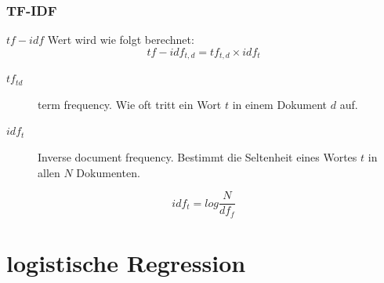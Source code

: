 \documentclass{beamer}
\begin{document}
\begin{frame}
  \frametitle{TF-IDF}
  $tf-idf$ Wert wird wie folgt berechnet:
\[
tf-idf_{t,d} = tf_{t,d} \times idf_t
\]

\begin{description}
\item[$tf_{td}$] term frequency. Wie oft tritt ein Wort $t$ in einem Dokument $d$ auf. 
\item[$idf_t$] Inverse document frequency. Bestimmt die Seltenheit eines Wortes $t$ in allen $N$ Dokumenten.
\end{description}

\[
idf_t = log \frac{ N}{df_f}
\]

\end{frame}

\section{logistische Regression}
\label{sec:logisticRegression}
\end{document}
